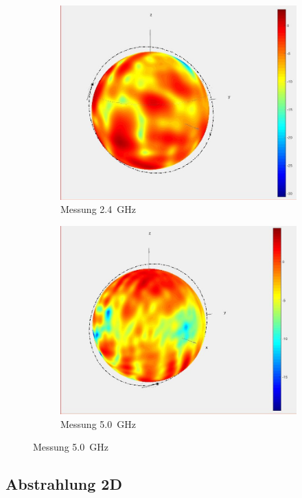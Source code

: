 \begin{figure}[h!]
	\begin{subfigure}[t]{0.49\textwidth}
	 	\includegraphics[width=1\textwidth]{../fig/plt/2_4GHz_justsphere.jpg}
		\caption{Messung \SI{2.4}{\giga\hertz}}
	\end{subfigure}
	\begin{subfigure}[t]{0.49\textwidth}
		\includegraphics[width=1\textwidth]{../fig/plt/5GHz_just_sphere.jpg}
		\caption{Messung \SI{5.0}{\giga\hertz}}
	\end{subfigure}
\end{figure}

\clearpage
\subsection{Abstrahlung 2D}

